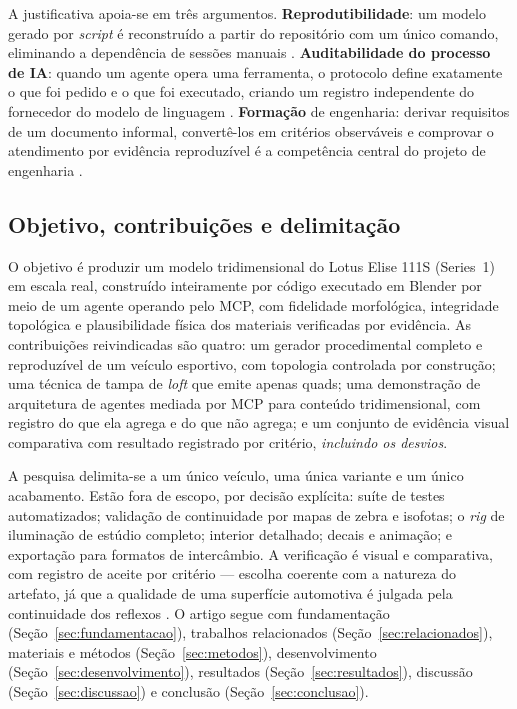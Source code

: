 A justificativa apoia-se em tr\^es argumentos. \textbf{Reprodutibilidade}: um modelo gerado
por \emph{script} \'e reconstru\'ido a partir do reposit\'orio com um \'unico comando,
eliminando a depend\^encia de sess\~oes manuais \cite{shah1995}. \textbf{Auditabilidade do
processo de IA}: quando um agente opera uma ferramenta, o protocolo define exatamente o que
foi pedido e o que foi executado, criando um registro independente do fornecedor do modelo
de linguagem \cite{schick2023, patil2023, yao2023}. \textbf{Forma\c{c}\~ao} de engenharia:
derivar requisitos de um documento informal, convert\^e-los em crit\'erios observ\'aveis e
comprovar o atendimento por evid\^encia reproduz\'ivel \'e a compet\^encia central do projeto
de engenharia \cite{pahl2007, otto2001}.

\subsection{Objetivo, contribui\c{c}\~oes e delimita\c{c}\~ao}

O objetivo \'e produzir um modelo tridimensional do Lotus Elise 111S (Series~1) em escala
real, constru\'ido inteiramente por c\'odigo executado em Blender por meio de um agente
operando pelo MCP, com fidelidade morfol\'ogica, integridade topol\'ogica e plausibilidade
f\'isica dos materiais verificadas por evid\^encia. As contribui\c{c}\~oes reivindicadas
s\~ao quatro: um gerador procedimental completo e reproduz\'ivel de um ve\'iculo
esportivo, com topologia controlada por constru\c{c}\~ao; uma t\'ecnica de tampa de
\emph{loft} que emite apenas quads; uma demonstra\c{c}\~ao de arquitetura de agentes mediada
por MCP para conte\'udo tridimensional, com registro do que ela agrega e do que n\~ao
agrega; e um conjunto de evid\^encia visual comparativa com resultado registrado por
crit\'erio, \emph{incluindo os desvios}.

A pesquisa delimita-se a um \'unico ve\'iculo, uma \'unica variante e um \'unico
acabamento. Est\~ao fora de escopo, por decis\~ao expl\'icita: su\'ite de testes
automatizados; valida\c{c}\~ao de continuidade por mapas de zebra e isofotas; o \emph{rig}
de ilumina\c{c}\~ao de est\'udio completo; interior detalhado; decais e
anima\c{c}\~ao; e exporta\c{c}\~ao para formatos de interc\^ambio. A
verifica\c{c}\~ao \'e visual e comparativa, com registro de aceite por crit\'erio ---
escolha coerente com a natureza do artefato, j\'a que a qualidade de uma superf\'icie
automotiva \'e julgada pela continuidade dos reflexos \cite{halstead1993}. O artigo segue
com fundamenta\c{c}\~ao (Se\c{c}\~ao~\ref{sec:fundamentacao}), trabalhos relacionados
(Se\c{c}\~ao~\ref{sec:relacionados}), materiais e m\'etodos
(Se\c{c}\~ao~\ref{sec:metodos}), desenvolvimento
(Se\c{c}\~ao~\ref{sec:desenvolvimento}), resultados
(Se\c{c}\~ao~\ref{sec:resultados}), discuss\~ao (Se\c{c}\~ao~\ref{sec:discussao}) e
conclus\~ao (Se\c{c}\~ao~\ref{sec:conclusao}).
